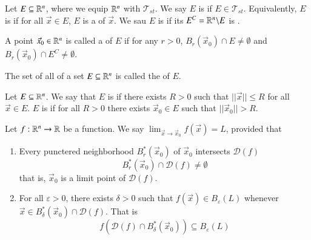 \documentclass[12pt, a4paper, oneside, openright, titlepage]{book}
\begin{document}
\begin{appendices}
    \begin{defn}
        Let $E \subseteq \mathbb R^n$, where we equip $\mathbb R^n$ with $\mathscr{T}_{st}$. We say $E$ is  if $E \in \mathscr{T}_{st}$. Equivalently, $E$ is  if for all $\vec{x} \in E$, $E$ is a  of $\vec{x}$. We sau $E$ is  if its  $E^C = \mathbb R^n\backslash E$ is .
    \end{defn}

    \begin{defn}
        A point $\vec{x}_0 \in \mathbb R^n$ is called a  of $E$ if for any $r > 0$, $B_r(\vec{x}_0) \cap E \neq \emptyset$ and $B_r(\vec{x}_0) \cap E^C \neq \emptyset$.
    \end{defn}

    \begin{defn}
        The set of all  of a set $E \subseteq \mathbb R^n$ is called the  of $E$.
    \end{defn}

    \begin{defn}
        Let $E \subseteq \mathbb R^n$. We say that $E$ is  if there exists $R > 0$ such that $||\vec{x}|| \leq R$ for all $\vec{x} \in E$. $E$ is  if for all $R > 0$ there exists $\vec{x}_0 \in E$ such that $||\vec{x}_0|| > R$.
    \end{defn}


    \begin{defn}
        Let $f:\mathbb R^n\rightarrow \mathbb R$ be a function. We say $\lim_{\vec{x}\rightarrow \vec{x}_0}f(\vec{x}) = L$, provided that \begin{enumerate}
            \item Every punctered neighborhood $B_r^*(\vec{x}_0)$ of $\vec{x}_0$ intersects $\mathscr{D}(f)$ 
                \begin{equation}
                        B_r^*(\vec{x}_0) \cap \mathscr{D}(f) \neq \emptyset
                \end{equation}
                that is, $\vec{x}_0$ is a limit point of $\mathscr{D}(f)$.
            \item For all $\varepsilon > 0$, there exists $\delta > 0$ such that $f(\vec{x}) \in B_{\varepsilon}(L)$ whenever $\vec{x} \in B_{\delta}^*(\vec{x}_0) \cap \mathscr{D}(f)$. That is \begin{equation}
                    f(\mathscr{D}(f)\cap B_{\delta}^*(\vec{x}_0)) \subseteq B_{\varepsilon}(L)
            \end{equation}
        \end{enumerate}
    \end{defn}


\end{appendices}
\end{document}
